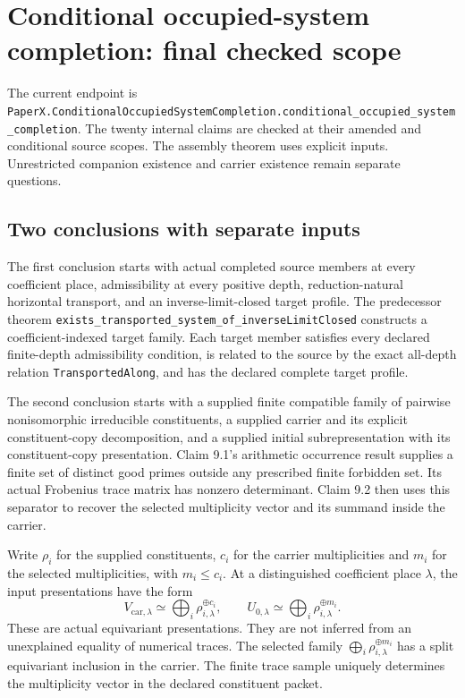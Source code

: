 \clearpage
\section{Conditional occupied-system completion: final checked scope}
\label{sec:conditional-final}
The current endpoint is
\nolinkurl{PaperX.ConditionalOccupiedSystemCompletion.conditional_occupied_system_completion}.
The twenty internal claims are checked at their amended and conditional source scopes. The assembly theorem uses explicit inputs. Unrestricted companion existence and carrier existence remain separate questions.

\subsection{Two conclusions with separate inputs}
The first conclusion starts with actual completed source members at every coefficient place, admissibility at every positive depth, reduction-natural horizontal transport, and an inverse-limit-closed target profile. The predecessor theorem
\nolinkurl{exists_transported_system_of_inverseLimitClosed}
constructs a coefficient-indexed target family. Each target member satisfies every declared finite-depth admissibility condition, is related to the source by the exact all-depth relation \nolinkurl{TransportedAlong}, and has the declared complete target profile.

The second conclusion starts with a supplied finite compatible family of pairwise nonisomorphic irreducible constituents, a supplied carrier and its explicit constituent-copy decomposition, and a supplied initial subrepresentation with its constituent-copy presentation. Claim 9.1's arithmetic occurrence result supplies a finite set of distinct good primes outside any prescribed finite forbidden set. Its actual Frobenius trace matrix has nonzero determinant. Claim 9.2 then uses this separator to recover the selected multiplicity vector and its summand inside the carrier.

Write $\rho_i$ for the supplied constituents, $c_i$ for the carrier multiplicities and $m_i$ for the selected multiplicities, with $m_i\leq c_i$. At a distinguished coefficient place $\lambda$, the input presentations have the form
\[
 V_{\mathrm{car},\lambda}\simeq\bigoplus_i\rho_{i,\lambda}^{\oplus c_i},
 \qquad U_{0,\lambda}\simeq\bigoplus_i\rho_{i,\lambda}^{\oplus m_i}.
\]
These are actual equivariant presentations. They are not inferred from an unexplained equality of numerical traces. The selected family
$\bigoplus_i\rho_{i,\lambda}^{\oplus m_i}$
has a split equivariant inclusion in the carrier. The finite trace sample uniquely determines the multiplicity vector in the declared constituent packet.

